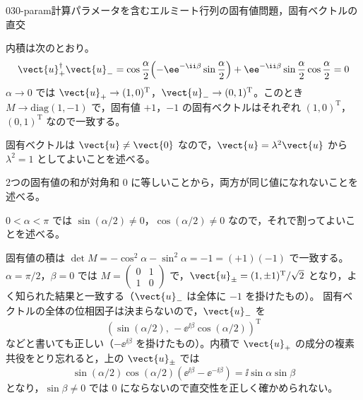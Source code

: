 \documentclass[uplatex,dvipdfmx,a4paper,11pt]{jsarticle}
\begin{document}
\begin{mondai}{030-param}{計算}{パラメータを含むエルミート行列の固有値問題，固有ベクトルの直交}
\begin{tadashii}
 内積は次のとおり。
\[ \vect{u}_{+}^{\dagger}\vect{u}_{-}=\cos\frac{\alpha}{2}\Bigl(-\ee^{-\ii\beta}\sin\frac{\alpha}{2}\Bigr)+\ee^{-\ii\beta}\sin\frac{\alpha}{2}\cos\frac{\alpha}{2}=0 \]
$\alpha\to 0$ では $\vect{u}_{+}\to(1,0)^{\mathrm{T}}$，$\vect{u}_{-}\to(0,1)^{\mathrm{T}}$。このとき $M\to\mathrm{diag}(1,-1)$ で，固有値 $+1$，$-1$ の固有ベクトルはそれぞれ $(1,0)^{\mathrm{T}}$，$(0,1)^{\mathrm{T}}$ なので一致する。
\begin{ronten}
  \item {} 固有ベクトルは $\vect{u}\neq\vect{0}$ なので，$\vect{u}=\lambda^{2}\vect{u}$ から $\lambda^{2}=1$ としてよいことを述べる。
  \item {} 2つの固有値の和が対角和 0 に等しいことから，両方が同じ値になれないことを述べる。
  \item {} $0<\alpha<\pi$ では $\sin(\alpha/2)\neq0$，$\cos(\alpha/2)\neq0$ なので，それで割ってよいことを述べる。
\end{ronten}
\kenzan 固有値の積は $\det M=-\cos^{2}\alpha-\sin^{2}\alpha=-1=(+1)(-1)$ で一致する。$\alpha=\pi/2$，$\beta=0$ では $M=\begin{pmatrix}0&1\\1&0\end{pmatrix}$ で，$\vect{u}_{\pm}=(1,\pm1)^{\mathrm{T}}/\sqrt{2}$ となり，よく知られた結果と一致する（$\vect{u}_{-}$ は全体に $-1$ を掛けたもの）。
\tsumazuki 固有ベクトルの全体の位相因子は決まらないので，$\vect{u}_{-}$ を
\[ (\sin(\alpha/2),\,-\ee^{\ii\beta}\cos(\alpha/2))^{\mathrm{T}} \]
などと書いても正しい（$-\ee^{\ii\beta}$ を掛けたもの）。内積で $\vect{u}_{+}$ の成分の複素共役をとり忘れると，上の $\vect{u}_{\pm}$ では
\[ \sin(\alpha/2)\cos(\alpha/2)(\ee^{\ii\beta}-\ee^{-\ii\beta})=\ii\sin\alpha\sin\beta \]
となり，$\sin\beta\neq 0$ では 0 にならないので直交性を正しく確かめられない。
\end{tadashii}
\end{mondai}
\end{document}
